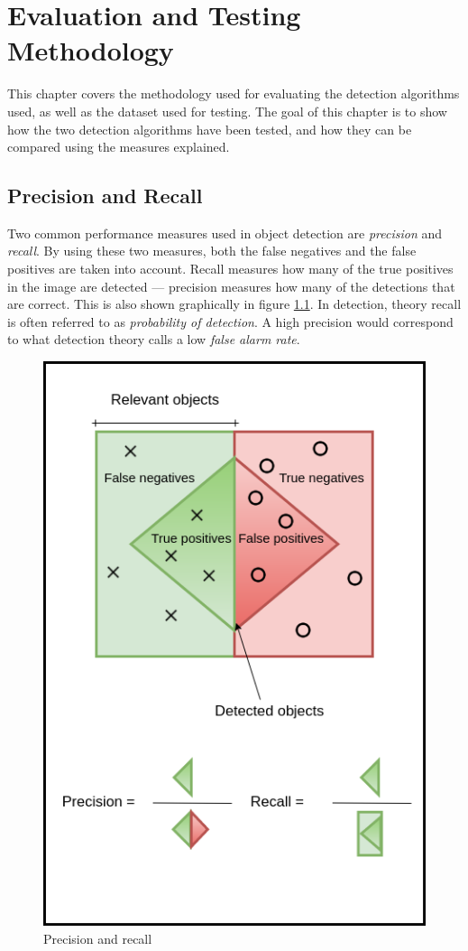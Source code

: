 
\chapter{Evaluation and Testing Methodology}
This chapter covers the methodology used for evaluating the detection algorithms used, as well as the dataset used for testing. The goal of this chapter is to show how the two detection algorithms have been tested, and how they can be compared using the measures explained.

\section{Precision and Recall}
\label{sec:prec_rec}

Two common performance measures used in object detection are \textit{precision} and \textit{recall}. By using these two measures, both the false negatives and the false positives are taken into account. Recall measures how many of the true positives in the image are detected — precision measures how many of the detections that are correct. This is also shown graphically in figure \ref{fig:prec_recall}. In detection, theory recall is often referred to as \textit{probability of detection}. A high precision would correspond to what detection theory calls a low \textit{false alarm rate}.

\begin{figure}[h!]
    \centering
    \includegraphics[scale=0.35]{fig/recall_precision.png}
    \caption{Precision and recall}
    \label{fig:prec_recall}
\end{figure}


